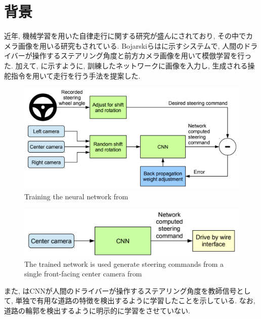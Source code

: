 
\section{背景}
近年, 機械学習を用いた自律走行に関する研究が盛んにされており, その中でカメラ画像を用いる研究もされている. Bojarskiら\cite{bojarski}はに示すシステムで, 人間のドライバーが操作するステアリング角度と前方カメラ画像を用いて模倣学習を行った. 加えて, に示すように, 訓練したネットワークに画像を入力し, 生成される操舵指令を用いて走行を行う手法を提案した.

\vspace{0.5cm}

\begin{figure}[hbtp]
  \centering
 \includegraphics[keepaspectratio, scale=0.9]
      {images/bojarski_train.png}
 \caption{Training the neural network from \cite{bojarski}}
 \label{Fig:bojarski_train}
\end{figure}

\begin{figure}[hbtp]
     \centering
    \includegraphics[keepaspectratio, scale=0.7]
         {images/bojarski_test.png}
    \caption{The trained network is used generate steering commands from a single front-facing center camera from \cite{bojarski}}
    \label{Fig:bojarski_test}
\end{figure}

また, はCNNが人間のドライバーが操作するステアリング角度を教師信号として, 単独で有用な道路の特徴を検出するように学習したことを示している. なお, 道路の輪郭を検出するように明示的に学習をさせていない.

